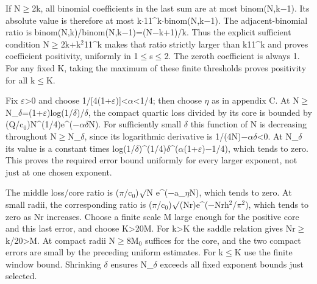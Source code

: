 \documentclass[11pt,a4paper]{article}
\begin{document}
If N\ensuremath{\geq}2k, all binomial coefficients in the last sum are at most binom(N,k\ensuremath{-}1). Its absolute value is therefore at most k\ensuremath{\cdot}11\textasciicircum{}k\ensuremath{\cdot}binom(N,k\ensuremath{-}1). The adjacent-binomial ratio is binom(N,k)/binom(N,k\ensuremath{-}1)=(N\ensuremath{-}k+1)/k. Thus the explicit sufficient condition N\ensuremath{\geq}2k+k\ensuremath{^2}11\textasciicircum{}k makes that ratio strictly larger than k11\textasciicircum{}k and proves coefficient positivity, uniformly in 1\ensuremath{\leq}s\ensuremath{\leq}2. The zeroth coefficient is always 1. For any fixed K, taking the maximum of these finite thresholds proves positivity for all k\ensuremath{\leq}K.

Fix \ensuremath{\varepsilon}>0 and choose 1/[4(1+\ensuremath{\varepsilon})]<\ensuremath{\alpha}<1/4; then choose \ensuremath{\eta} as in appendix C. At N\ensuremath{\geq}N\_\ensuremath{\delta}=(1+\ensuremath{\varepsilon})log(1/\ensuremath{\delta})/\ensuremath{\delta}, the compact quartic loss divided by its core is bounded by (Q/c\ensuremath{_0})N\textasciicircum{}(1/4)e\textasciicircum{}(\ensuremath{-}\ensuremath{\alpha}\ensuremath{\delta}N). For sufficiently small \ensuremath{\delta} this function of N is decreasing throughout N\ensuremath{\geq}N\_\ensuremath{\delta}, since its logarithmic derivative is 1/(4N)\ensuremath{-}\ensuremath{\alpha}\ensuremath{\delta}<0. At N\_\ensuremath{\delta} its value is a constant times log(1/\ensuremath{\delta})\textasciicircum{}(1/4)\ensuremath{\delta}\textasciicircum{}(\ensuremath{\alpha}(1+\ensuremath{\varepsilon})\ensuremath{-}1/4), which tends to zero. This proves the required error bound uniformly for every larger exponent, not just at one chosen exponent.

The middle loss/core ratio is (\ensuremath{\pi}/c\ensuremath{_0})\ensuremath{\surd}N e\textasciicircum{}(\ensuremath{-}a\_\ensuremath{\eta}N), which tends to zero. At small radii, the corresponding ratio is (\ensuremath{\pi}/c\ensuremath{_0})\ensuremath{\surd}(Nr)e\textasciicircum{}(\ensuremath{-}Nrh\ensuremath{^2}/\ensuremath{\pi}\ensuremath{^2}), which tends to zero as Nr increases. Choose a finite scale M large enough for the positive core and this last error, and choose K>20M. For k>K the saddle relation gives Nr\ensuremath{\geq}k/20>M. At compact radii N\ensuremath{\geq}8M\ensuremath{_0} suffices for the core, and the two compact errors are small by the preceding uniform estimates. For k\ensuremath{\leq}K use the finite window bound. Shrinking \ensuremath{\delta} ensures N\_\ensuremath{\delta} exceeds all fixed exponent bounds just selected.
\end{document}

